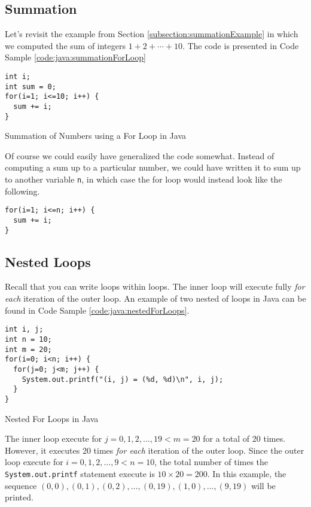 \subsection{Summation}

Let's revisit the example from Section \ref{subsection:summationExample} in which
we computed the sum of integers $1 + 2 + \cdots + 10$.  The code is presented in
Code Sample \ref{code:java:summationForLoop}

\begin{listing}[H]
\begin{verbatim}
int i;
int sum = 0;
for(i=1; i<=10; i++) {
  sum += i;
}
\end{verbatim}
  \caption{Summation of Numbers using a For Loop in Java}
  \label{code:java:summationForLoop}
\end{listing}

Of course we could easily have generalized the code somewhat.  Instead of computing
a sum up to a particular number, we could have written it to sum up to another
variable \texttt{n}, in which case the for loop would instead look like the
following.

\begin{verbatim}
for(i=1; i<=n; i++) {
  sum += i;
}
\end{verbatim}

\subsection{Nested Loops}

Recall that you can write loops within loops.  The inner loop will execute fully 
\emph{for each} iteration of the outer loop.  An example of two nested of
loops in Java can be found in Code Sample \ref{code:java:nestedForLoops}.

\begin{listing}[H]
\begin{verbatim}
int i, j;
int n = 10;
int m = 20;
for(i=0; i<n; i++) {
  for(j=0; j<m; j++) {
    System.out.printf("(i, j) = (%d, %d)\n", i, j);
  }
}
\end{verbatim}
  \caption{Nested For Loops in Java}
  \label{code:java:nestedForLoops}
\end{listing}

The inner loop execute for $j = 0, 1, 2, \ldots, 19 < m = 20$ for a total
of 20 times.  However, it executes 20 times \emph{for each} iteration of
the outer loop.  Since the outer loop execute for $i = 0, 1, 2, \ldots, 9 < n = 10$, 
the total number of times the \texttt{System.out.printf} statement execute is
$10 \times 20 = 200$.  In this example, the sequence $(0, 0), (0, 1), (0, 2), \ldots, (0,19), (1, 0), \ldots, (9, 19)$
will be printed.

